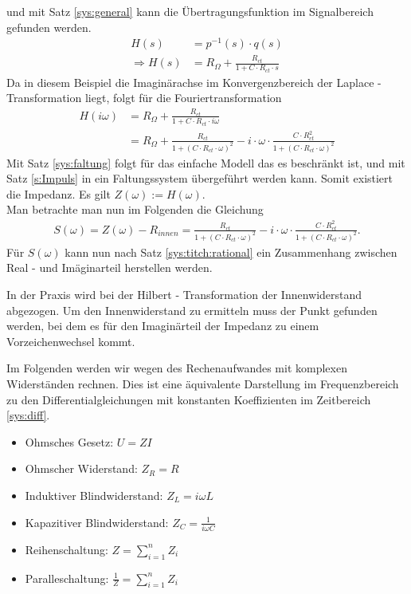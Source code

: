 und mit Satz \ref{sys:general} kann die Übertragungsfunktion im Signalbereich gefunden werden. 
\begin{align}
H(s)&=p^{-1}(s)\cdot q(s)\\
\Rightarrow H(s) &= R_{\Omega} + \frac{R_{ct}}{1 + C \cdot R_{ct} \cdot s }
\end{align}
Da in diesem Beispiel die Imaginärachse im Konvergenzbereich der Laplace - Transformation liegt, folgt für die Fouriertransformation
\begin{align}
H(i\omega) 		&= R_{\Omega} + \frac{R_{ct}}{1 + C \cdot R_{ct} \cdot i\omega }\\
			 	&= R_{\Omega} + \frac{R_{ct}}{1 + (C \cdot R_{ct} \cdot \omega)^2 } - i \cdot \omega \cdot \frac{C \cdot R_{ct}^2}{1 + (C \cdot R_{ct} \cdot \omega)^2 }\label{gl:Trans}
\end{align}
Mit Satz \ref{sys:faltung} folgt für das einfache Modell das es beschränkt ist, und mit Satz \ref{s:Impuls} in ein Faltungssystem übergeführt werden kann. Somit existiert die Impedanz. Es gilt $Z(\omega) := H(\omega)$.\\
Man betrachte man nun im Folgenden die Gleichung 
\begin{align}
	S(\omega) = Z(\omega) - R_{innen} =  \frac{R_{ct}}{1 + (C \cdot R_{ct} \cdot \omega)^2 } - i \cdot \omega \cdot \frac{C \cdot R_{ct}^2}{1 + (C \cdot R_{ct} \cdot \omega)^2 } \text{.}
\end{align}
Für $S(\omega)$ kann nun nach Satz \ref{sys:titch:rational} ein Zusammenhang zwischen Real - und Imäginarteil herstellen werden. 
\begin{bem}
	In der Praxis wird bei der Hilbert - Transformation der Innenwiderstand abgezogen. Um den Innenwiderstand zu ermitteln muss der Punkt gefunden werden, bei dem es für den Imaginärteil der Impedanz zu einem Vorzeichenwechsel kommt.
\end{bem}

Im Folgenden werden wir wegen des Rechenaufwandes mit komplexen Widerständen rechnen. Dies ist eine äquivalente Darstellung im Frequenzbereich zu den Differentialgleichungen mit konstanten Koeffizienten im Zeitbereich \ref{sys:diff}.
\begin{itemize}\label{mod:rules}
	\item Ohmsches Gesetz:  $U = Z I$ 
	\item Ohmscher Widerstand: 	$Z_R = R$
	\item Induktiver Blindwiderstand: $Z_L = i \omega L$
	\item Kapazitiver Blindwiderstand: $Z_C = \frac{1}{i \omega C}$
	\item Reihenschaltung:  $Z = \sum_{i = 1}^{n} Z_i$
	\item Paralleschaltung: $\frac{1}{Z} = \sum_{i=1}^{n} Z_i$
\end{itemize}\cite[Seite 183]{Kuypers2012B2}

